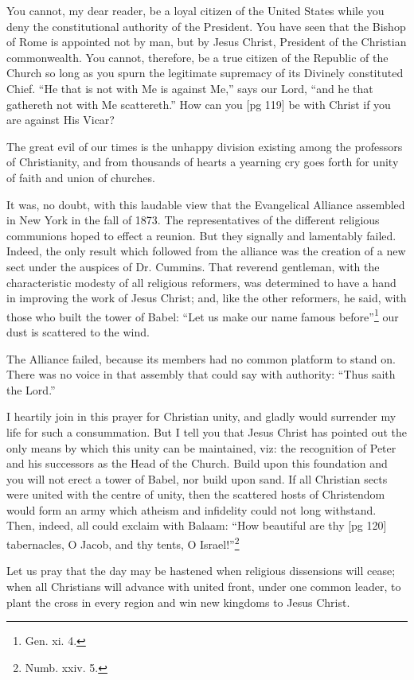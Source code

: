 You cannot, my dear reader, be a loyal citizen
of the United States while you deny the constitutional
authority of the President. You have seen
that the Bishop of Rome is appointed not by man,
but by Jesus Christ, President of the Christian
commonwealth. You cannot, therefore, be a true
citizen of the Republic of the Church so long as
you spurn the legitimate supremacy of its Divinely
constituted Chief. “He that is not with
Me is against Me,” says our Lord, “and he that
gathereth not with Me scattereth.” How can you
[pg 119]
be with Christ if you are against His Vicar?

The great evil of our times is the unhappy division
existing among the professors of Christianity,
and from thousands of hearts a yearning cry
goes forth for unity of faith and union of churches.

It was, no doubt, with this laudable view that
the Evangelical Alliance assembled in New York
in the fall of 1873. The representatives of the
different religious communions hoped to effect a
reunion. But they signally and lamentably failed.
Indeed, the only result which followed from the
alliance was the creation of a new sect under the
auspices of Dr. Cummins. That reverend gentleman,
with the characteristic modesty of all religious
reformers, was determined to have a hand
in improving the work of Jesus Christ; and, like
the other reformers, he said, with those who built
the tower of Babel: “Let us make our name
famous before”\footnote{Gen. xi.
4.} our dust is scattered to the wind.

The Alliance failed, because its members had no
common platform to stand on. There was no voice
in that assembly that could say with authority:
“Thus saith the Lord.”

I heartily join in this prayer for Christian unity,
and gladly would surrender my life for such a
consummation. But I tell you that Jesus Christ
has pointed out the only means by which this unity
can be maintained, viz: the recognition of Peter
and his successors as the Head of the Church.
Build upon this foundation and you will not erect
a tower of Babel, nor build upon sand. If all
Christian sects were united with the centre of
unity, then the scattered hosts of Christendom
would form an army which atheism and infidelity
could not long withstand. Then, indeed, all could
exclaim with Balaam: “How beautiful are thy
[pg 120]
tabernacles, O Jacob, and thy tents, O Israel!”\footnote{Numb.
xxiv. 5.}

Let us pray that the day may be hastened when
religious dissensions will cease; when all Christians
will advance with united front, under one
common leader, to plant the cross in every region
and win new kingdoms to Jesus Christ.

